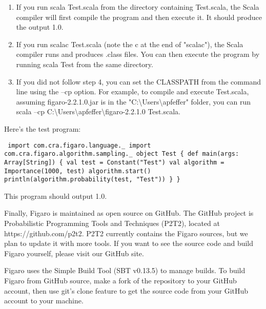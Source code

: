 \begin{enumerate}
\begin{enumerate}
\item If you run scala Test.scala from the directory containing Test.scala, the Scala compiler will first compile the program and then execute it. It should produce the output 1.0.
\item If you run scalac Test.scala (note the c at the end of "scalac"), the Scala compiler runs and produces .class files. You can then execute the program by running scala Test from the same directory.
\item If you did not follow step 4, you can set the CLASSPATH from the command line using the --cp option. For example, to compile and execute Test.scala, assuming figaro-2.2.1.0.jar is in the "C:\textbackslash Users\textbackslash apfeffer" folder, you can run scala --cp C:\textbackslash Users\textbackslash apfeffer\textbackslash figaro-2.2.1.0 Test.scala.
\end{enumerate}
\end{enumerate}

Here's the test program:

\texttt{
\newline import com.cra.figaro.language.\_
\newline import com.cra.figaro.algorithm.sampling.\_
\newline 
\newline object Test \{
\newline   def main(args: Array[String]) \{
\newline     val test = Constant("Test")
\newline     val algorithm = Importance(1000, test)
\newline     algorithm.start()
\newline     println(algorithm.probability(test, "Test"))
\newline   \}
\newline \}
}
\newline

This program should output 1.0.

Finally, Figaro is maintained as open source on GitHub. The GitHub project is Probabilistic Programming Tools and Techniques (P2T2), located at https://github.com/p2t2. P2T2 currently contains the Figaro sources, but we plan to update it with more tools. If you want to see the source code and build Figaro yourself, please visit our GitHub site.

Figaro uses the Simple Build Tool (SBT v0.13.5) to manage builds. To build Figaro from GitHub source, make a fork of the repository to your GitHub account, then use git's clone feature to get the source code from your GitHub account to your machine.


